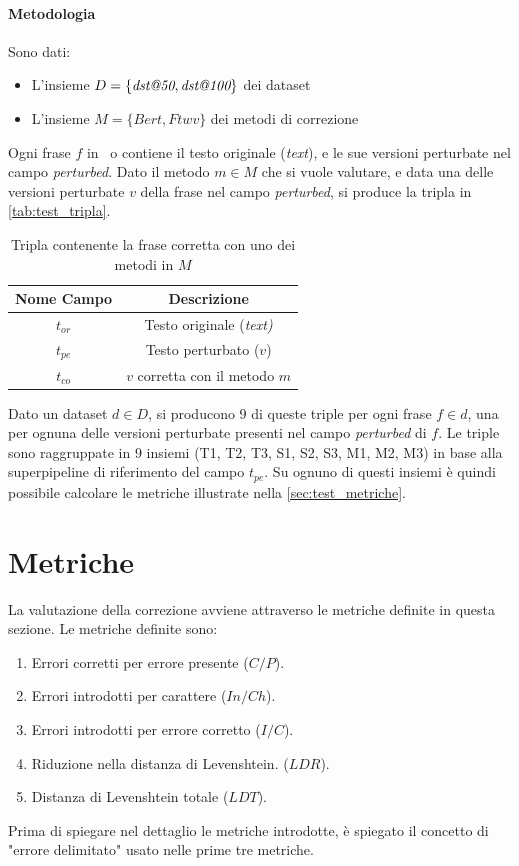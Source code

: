 \paragraph{Metodologia} Sono dati:
\begin{itemize}
\item L'insieme $D = \{\textit{dst@50}, \textit{dst@100} \}$ dei dataset
\item L'insieme $M = \{\textit{Bert}, \textit{Ftwv}\}$ dei metodi di correzione
\end{itemize}
Ogni frase $f$ in \dsta\ o \dstb contiene il testo originale (\textit{text}), e le sue versioni perturbate nel campo \textit{perturbed}. Dato il metodo $m \in M$ che si vuole valutare, e data una delle versioni perturbate $v$ della frase nel campo \textit{perturbed}, si produce la tripla in \autoref{tab:test_tripla}.

\begin{table}[H]
\centering
\begin{tabular}{cc}
\textbf{Nome Campo} & \textbf{Descrizione} \\
\hline
$t_{or}$ & Testo originale (\textit{text)}\\
$t_{pe}$ & Testo perturbato ($v$)\\
$t_{co}$ & $v$ corretta con il metodo $m$
\end{tabular}
\caption{Tripla contenente la frase corretta con uno dei metodi in $M$}
\label{tab:test_tripla}
\end{table}
\noindent
Dato un dataset $d \in D$, si producono 9 di queste triple per ogni frase $f \in d$, una per ognuna delle versioni perturbate presenti nel campo \textit{perturbed} di  $f$. Le triple sono raggruppate in 9 insiemi (T1, T2, T3, S1, S2, S3, M1, M2, M3) in base alla superpipeline di riferimento del campo $t_{pe}$. Su ognuno di questi insiemi è quindi possibile calcolare le metriche illustrate nella \autoref{sec:test_metriche}.

\section{Metriche}
\label{sec:test_metriche}
La valutazione della correzione avviene attraverso le metriche definite in questa sezione. Le metriche definite sono:
\begin{enumerate}
\item Errori corretti per errore presente ($C/P$).
\item Errori introdotti per carattere ($In/Ch$).
\item Errori introdotti per errore corretto ($I/C$).
\item Riduzione nella distanza di Levenshtein. ($LDR$).
\item Distanza di Levenshtein totale ($LDT$).
\end{enumerate}
\noindent
Prima di spiegare nel dettaglio le metriche introdotte, è spiegato il concetto di "errore delimitato" usato nelle prime tre metriche.

